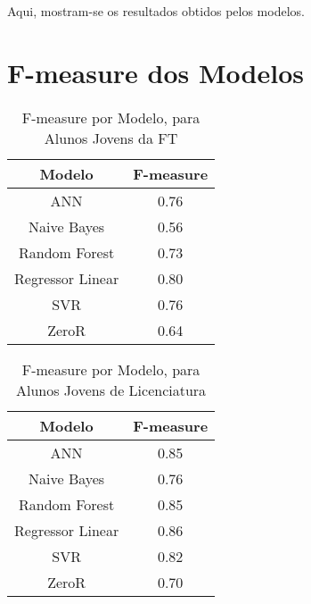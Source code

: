 Aqui, mostram-se os resultados obtidos pelos modelos.

\section{F-measure dos Modelos}

\begin{table}
\begin{center}
\begin{tabular}[c]{| c | c |}
    \hline
    \textbf{Modelo} & \textbf{F-measure} \\
    \hline
    ANN              & 0.76 \\
    \hline
    Naive Bayes      & 0.56 \\
    \hline
    Random Forest    & 0.73 \\
    \hline
    Regressor Linear & 0.80 \\
    \hline
    SVR              & 0.76 \\
    \hline
    ZeroR            & 0.64 \\
    \hline
\end{tabular}
\end{center}
\caption{F-measure por Modelo, para Alunos Jovens da FT}
\end{table}

\begin{table}
\begin{center}
\begin{tabular}[c]{| c | c |}
    \hline
    \textbf{Modelo} & \textbf{F-measure} \\
    \hline
    ANN              & 0.85 \\
    \hline
    Naive Bayes      & 0.76 \\
    \hline
    Random Forest    & 0.85 \\
    \hline
    Regressor Linear & 0.86 \\
    \hline
    SVR              & 0.82 \\
    \hline
    ZeroR            & 0.70 \\
    \hline
\end{tabular}
\end{center}
\caption{F-measure por Modelo, para Alunos Jovens de Licenciatura}
\end{table}

